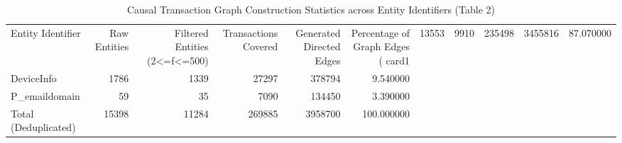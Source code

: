 \begin{table}
\caption{Causal Transaction Graph Construction Statistics across Entity Identifiers (Table 2)}
\label{tab:edge_stats}
\begin{tabular}{lrrrrr}
\toprule
Entity Identifier & Raw Entities & Filtered Entities (2<=f<=500) & Transactions Covered & Generated Directed Edges & Percentage of Graph Edges (%
\midrule
card1 & 13553 & 9910 & 235498 & 3455816 & 87.070000 \\
DeviceInfo & 1786 & 1339 & 27297 & 378794 & 9.540000 \\
P_emaildomain & 59 & 35 & 7090 & 134450 & 3.390000 \\
Total (Deduplicated) & 15398 & 11284 & 269885 & 3958700 & 100.000000 \\
\bottomrule
\end{tabular}
\end{table}
